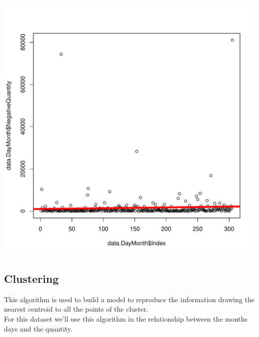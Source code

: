 \documentclass[conference]{IEEEtran}\usepackage[]{graphicx}\usepackage[]{color}
\makeatletter
\def\maxwidth{ %
  \ifdim\Gin@nat@width>\linewidth
    \linewidth
  \else
    \Gin@nat@width
  \fi
}
\newenvironment{knitrout}{}{} %
\makeatother
\begin{document}
\begin{knitrout}
\color{fgcolor}
\includegraphics[width=\maxwidth]{figure/linear-regression2-1} 

\end{knitrout}

\subsection{Clustering}
This algorithm is used to build a model to reproduce the information drawing the nearest centroid to all the points of the cluster.\\
For this dataset we'll use this algorithm in the relationship between the months days and the quantity.
\end{document}
